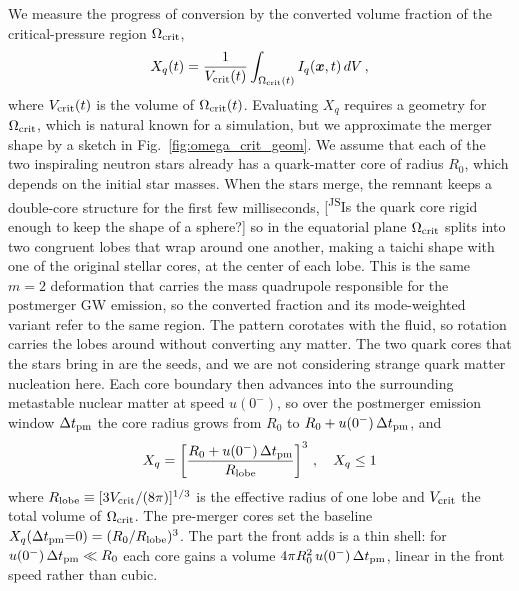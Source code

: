 \documentclass[10pt,superscriptaddress,
amsmath,aps,prc,twocolumn,nofootinbib,floatfix]{revtex4-1}
\newcommand{\JScom}[1]{\textsf{\color{violet} [\textsuperscript{JS}#1]}}
\begin{document}
{We measure the progress of conversion by the converted volume fraction of the critical-pressure region $\Omega_{\rm crit}$,
\begin{equation}
X_q(t)
=\frac{1}{V_{\rm crit}(t)}
\int_{\Omega_{\rm crit}(t)}I_q(\boldsymbol{x},t)\,dV\,,
\label{eq:converted_fraction}
\end{equation}
where $V_{\rm crit}(t)$ is the volume of $\Omega_{\rm crit}(t)$.
Evaluating $X_q$ requires a geometry for $\Omega_{\rm crit}$, which is natural known for a simulation, but we approximate the merger shape by a sketch in Fig.~\ref{fig:omega_crit_geom}.
We assume that each of the two inspiraling neutron stars already has a quark-matter core of radius $R_0$, which depends on the initial star masses.
When the stars merge, the remnant keeps a double-core structure for the first few milliseconds, \JScom{Is the quark core rigid enough to keep the shape of a sphere?} so in the equatorial plane $\Omega_{\rm crit}$ splits into two congruent lobes that wrap around one another, making a taichi shape with one of the original stellar cores, at the center of each lobe.
This is the same $m=2$ deformation that carries the mass quadrupole responsible for the postmerger GW emission, so the converted fraction and its mode-weighted variant refer to the same region.
The pattern corotates with the fluid, so rotation carries the lobes around without converting any matter.
The two quark cores that the stars bring in are the seeds, and we are not considering strange quark matter nucleation here.
Each core boundary then advances into the surrounding metastable nuclear matter at speed $u(0^-)$, so over the postmerger emission window $\Delta t_{\rm pm}$ the core radius grows from $R_0$ to $R_0+u(0^-)\,\Delta t_{\rm pm}$, and
\begin{equation}
X_q
=
\left[\frac{R_0+u(0^-)\,\Delta t_{\rm pm}}{R_{\rm lobe}}\right]^{3}
\,,\quad X_q \leq 1
\label{eq:lobe_fraction}
\end{equation}
where $R_{\rm lobe}\equiv[3V_{\rm crit}/(8\pi)]^{1/3}$ is the effective radius of one lobe and $V_{\rm crit}$ the total volume of $\Omega_{\rm crit}$.
The pre-merger cores set the baseline $X_q(\Delta t_{\rm pm}{=}0)=(R_0/R_{\rm lobe})^3$.
The part the front adds is a thin shell: for $u(0^-)\,\Delta t_{\rm pm}\ll R_0$ each core gains a volume $4\pi R_0^{2}\,u(0^-)\,\Delta t_{\rm pm}$, linear in the front speed rather than cubic.

}
\end{document}
